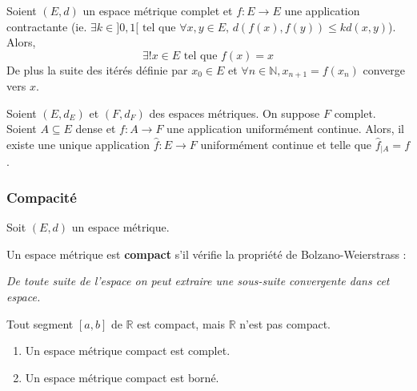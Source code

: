   \begin{application}
    Soient $(E,d)$ un espace métrique complet et $f : E \rightarrow E$ une application contractante (ie. $\exists k \in ]0,1[ \text{ tel que } \forall x, y \in E, \, d(f(x), f(y)) \leq k d(x, y)$). Alors,
    \[ \exists! x \in E \text{ tel que } f(x) = x \]
    De plus la suite des itérés définie par $x_0 \in E$ et $\forall n \in \mathbb{N}, x_{n+1} = f(x_n)$ converge vers $x$.
  \end{application}

  \begin{application}
    Soient $(E,d_E)$ et $(F,d_F)$ des espaces métriques. On suppose $F$ complet. Soient $A \subseteq E$ dense et $f : A \rightarrow F$ une application uniformément continue. Alors, il existe une unique application $\widehat{f} : E \rightarrow F$ uniformément continue et telle que $\widehat{f}_{|A} = f$.
  \end{application}

  \subsubsection{Compacité}

  \label{206-2}


  Soit $(E, d)$ un espace métrique.

  \begin{definition}
    Un espace métrique est \textbf{compact} s'il vérifie la propriété de Bolzano-Weierstrass :
    \begin{center}
      \textit{De toute suite de l'espace on peut extraire une sous-suite convergente dans cet espace.}
    \end{center}
  \end{definition}

  \begin{example}
    Tout segment $[a,b]$ de $\mathbb{R}$ est compact, mais $\mathbb{R}$ n'est pas compact.
  \end{example}

  \begin{proposition}
    \begin{enumerate}[label={\bfseries(\roman*)}]
      \item Un espace métrique compact est complet.
      \item Un espace métrique compact est borné.
    \end{enumerate}
  \end{proposition}

